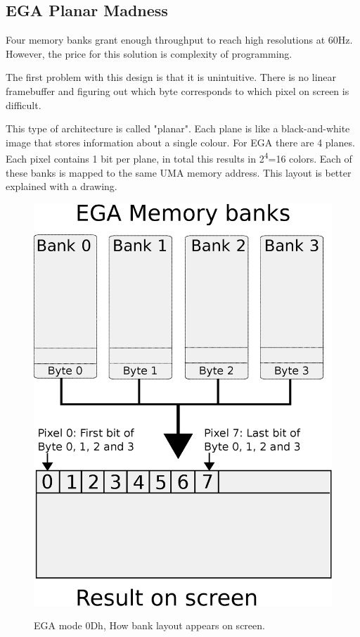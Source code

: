 \documentclass[book.tex]{subfiles}
\begin{document}
\subsection{EGA Planar Madness}
\label{section:EGA_Planar_Madness}

Four memory banks grant enough throughput to reach high resolutions at 60Hz. However, the price for this solution is complexity of programming. \\
\par
The first problem with this design is that it is unintuitive. There is no linear framebuffer and figuring out which byte corresponds to which pixel on screen is difficult.\\
\par
 This type of architecture is called "planar". Each plane is like a black-and-white image that stores information about a single colour. For EGA there are 4 planes. Each pixel contains 1 bit per plane, in total this results in 2\textsuperscript{4}=16 colors. Each of these banks is mapped to the same UMA memory address. This layout is better explained with a drawing.\\
\par
\begin{figure}[H]
\centering
\includegraphics[width=.57\textwidth]{imgs/drawings/ega_ram_screen_layout.eps}
\label{fig:ega_layout_banks}
\caption{EGA mode 0Dh, How bank layout appears on screen.}
\end{figure}

 
\end{document}

